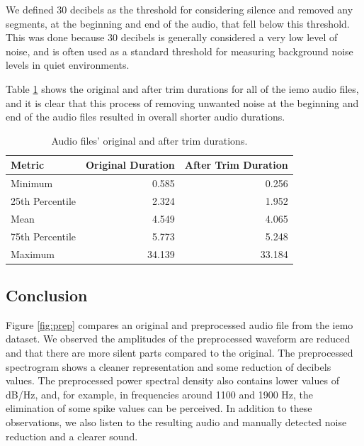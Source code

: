We defined 30 decibels as the threshold for considering silence and removed any segments, at the beginning and end of the audio, that fell below this threshold. This was done because 30 decibels is generally considered a very low level of noise, and is often used as a standard threshold for measuring background noise levels in quiet environments.

Table \ref{trim_durations} shows the original and after trim durations for all of the \ac{iemo} audio files, and it is clear that this process of removing unwanted noise at the beginning and end of the audio files resulted in overall shorter audio durations.

\begin{table}[H]
	\centering
	\caption{Audio files' original and after trim durations.}
	\label{trim_durations}
	\begin{tabular}{lrr}
		\toprule
		Metric & Original Duration & After Trim Duration \\
		\midrule
		Minimum  		&  0.585 	&  0.256 \\
		25th Percentile &  2.324	&  1.952 \\
		Mean 			&  4.549  	&  4.065 \\
		75th Percentile	&  5.773	&  5.248 \\
		Maximum 		& 34.139   	& 33.184 \\
		\bottomrule
	\end{tabular}
\end{table}



\subsection{Conclusion}

Figure \ref{fig:prep} compares an original and preprocessed audio file from the \ac{iemo} dataset. We observed the amplitudes of the preprocessed waveform are reduced and that there are more silent parts compared to the original. The preprocessed spectrogram shows a cleaner representation and some reduction of decibels values. The preprocessed power spectral density also contains lower values of dB/Hz, and, for example, in frequencies around 1100 and 1900 Hz, the elimination of some spike values can be perceived. In addition to these observations, we also listen to the resulting audio and manually detected noise reduction and a clearer sound.


